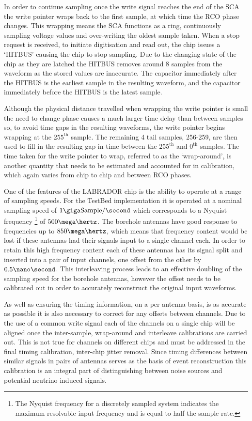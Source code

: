 In order to continue sampling once the write signal reaches the end of the SCA the write pointer wraps back to the first sample, at which time the RCO phase changes. This wrapping means the SCA functions as a ring, continuously sampling voltage values and over-writing the oldest sample taken. When a stop request is received, to initiate digitisation and read out, the chip issues a `HITBUS' causing the chip to stop sampling. Due to the changing state of the chip as they are latched the HITBUS removes around 8 samples from the waveform as the stored values are inaccurate. The capacitor immediately after the HITBUS is the earliest sample in the resulting waveform, and the capacitor immediately before the HITBUS is the latest sample. 

Although the physical distance travelled when wrapping the write pointer is small the need to change phase causes a much larger time delay than between samples so, to avoid time gaps in the resulting waveforms, the write pointer begins wrapping at the $255^{\mbox{th}}$ sample. The remaining 4 tail samples, 256-259, are then used to fill in the resulting gap in time between the $255^{\mbox{th}}$ and $0^{\mbox{th}}$ samples.  The time taken for the write pointer to wrap, referred to as the `wrap-around', is another quantity that needs to be estimated and accounted for in calibration, which again varies from chip to chip and between RCO phases.


One of the features of the LABRADOR chip is the ability to operate at a range of sampling speeds. For the TestBed implementation it is operated at a nominal sampling speed of $1 \giga \mbox{Sample} /\second$ which corresponds to a Nyquist frequency \footnote{The Nyquist frequency for a discretely sampled system indicates the maximum resolvable input frequency and is equal to half the sample rate.} of $500 \mega \hertz$. The borehole antennas have good response to frequencies up to $850 \mega \hertz$, which means that frequency content would be lost if these antennas had their signals input to a single channel each. In order to retain this high frequency content each of these antennas has its signal split and inserted into a pair of input channels, one offset from the other by $0.5 \nano \second$. This interleaving process leads to an effective doubling of the sampling speed for the borehole antennas, however the offset needs to be calibrated out in order to accurately reconstruct the original input waveforms. 

As well as ensuring the timing information, on a per antenna basis, is as accurate as possible it is also necessary to correct for any offsets between channels. Due to the use of a common write signal each of the channels on a single chip will be aligned once the inter-sample, wrap-around and interleave calibrations are carried out. This is not true for channels on different chips and must be addressed in the final timing calibration, inter-chip jitter removal. Since timing differences between similar signals in pairs of antennas serves as the basis of event reconstruction this calibration is an integral part of distinguishing between noise sources and potential neutrino induced signals. 


